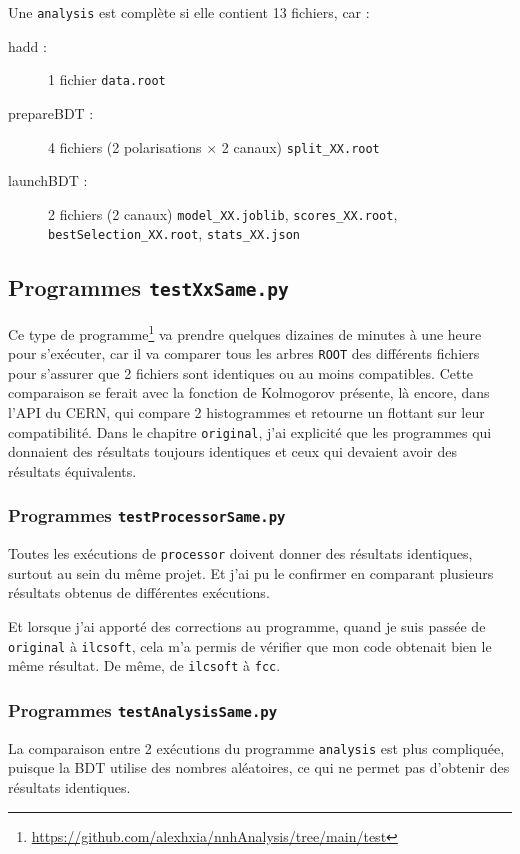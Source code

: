 \documentclass[10pt,a4paper]{report}
\newcommand{\ROOT}{\texttt{ROOT}\xspace}
\newcommand{\original}{\texttt{original}\xspace}
\newcommand{\ilcsoft}{\texttt{ilcsoft}\xspace}
\newcommand{\fcc}{\texttt{fcc}\xspace}
\newcommand{\processor}{\texttt{processor}\xspace}
\newcommand{\analysis}{\texttt{analysis}\xspace}
\begin{document}
Une \analysis est complète si elle contient 13 fichiers, car :
\begin{description}
	\item[hadd :] 1 fichier \verb|data.root|
	\item[prepareBDT :] 4 fichiers (2 polarisations $\times$ 2 canaux) \verb|split_XX.root| 
	\item[launchBDT :] 2 fichiers (2 canaux) \verb|model_XX.joblib|, \verb|scores_XX.root|, \verb|bestSelection_XX.root|, \verb|stats_XX.json|
\end{description}

\subsection{Programmes \texttt{testXxSame.py}}

Ce type de programme\footnote{\url{https://github.com/alexhxia/nnhAnalysis/tree/main/test}
} va prendre quelques dizaines de minutes à une heure pour s'exécuter, car il va comparer tous les arbres \ROOT des différents fichiers pour s'assurer que 2 fichiers sont identiques ou au moins compatibles. Cette comparaison se ferait avec la fonction de Kolmogorov présente, là encore, dans l'API du CERN, qui compare 2 histogrammes et retourne un flottant sur leur compatibilité. Dans le chapitre \original, j'ai explicité que les programmes qui donnaient des résultats toujours identiques et ceux qui devaient avoir des résultats équivalents. 

\subsubsection{Programmes \texttt{testProcessorSame.py}}

Toutes les exécutions de \processor doivent donner des résultats identiques, surtout au sein du même projet. Et j'ai pu le confirmer en comparant plusieurs résultats obtenus de différentes exécutions. 

Et lorsque j'ai apporté des corrections au programme, quand je suis passée de \original à \ilcsoft, cela m'a permis de vérifier que mon code obtenait bien le même résultat. De même, de \ilcsoft à \fcc.

\subsubsection{Programmes \texttt{testAnalysisSame.py}}

La comparaison entre 2 exécutions du programme \analysis est plus compliquée, puisque la BDT utilise des nombres aléatoires, ce qui ne permet pas d'obtenir des résultats identiques.
\end{document}
